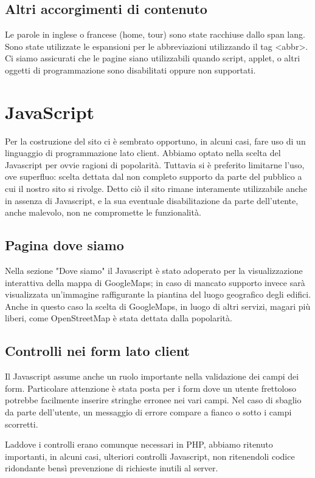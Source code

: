 \documentclass[10pt,a4paper,onecolumn]{article}
\begin{document}
\subsection{Altri accorgimenti di contenuto}
Le parole in inglese o francese (home, tour) sono state racchiuse dallo span lang.
Sono state utilizzate le espansioni per le abbreviazioni utilizzando il tag <abbr>.
Ci siamo assicurati che le pagine siano utilizzabili quando script, applet, o altri oggetti di programmazione sono disabilitati oppure non supportati.

\clearpage
\section{JavaScript}
Per la costruzione del sito ci è sembrato opportuno, in alcuni casi, fare uso di un linguaggio di programmazione lato client. Abbiamo optato nella scelta del Javascript per ovvie ragioni di popolarità. Tuttavia si è preferito limitarne l'uso, ove superfluo: scelta dettata dal non completo supporto da parte del pubblico a cui il nostro sito si rivolge. Detto ciò il sito rimane interamente utilizzabile anche in assenza di Javascript, e la sua eventuale disabilitazione da parte dell'utente, anche malevolo, non ne compromette le funzionalità.

\subsection{Pagina dove siamo}
Nella sezione "Dove siamo" il Javascript è stato adoperato per la visualizzazione interattiva della mappa di GoogleMaps; in caso di mancato supporto invece sarà visualizzata un'immagine raffigurante la piantina del luogo geografico degli edifici. Anche in questo caso la scelta di GoogleMaps, in luogo di altri servizi, magari più liberi, come OpenStreetMap è stata dettata dalla popolarità.

\subsection{Controlli nei form lato client}
Il Javascript assume anche un ruolo importante nella validazione dei campi dei form. Particolare attenzione è stata posta per i form dove un utente frettoloso potrebbe facilmente inserire stringhe erronee nei vari campi. Nel caso di sbaglio da parte dell'utente, un messaggio di errore compare a fianco o sotto i campi scorretti.

Laddove i controlli erano comunque necessari in PHP, abbiamo ritenuto importanti, in alcuni casi, ulteriori controlli Javascript, non ritenendoli codice ridondante bensì prevenzione di richieste inutili al server.
\end{document}
